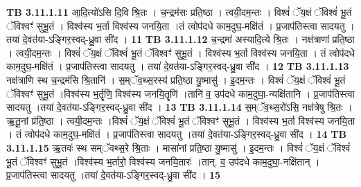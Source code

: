 \documentclass[17pt]{extarticle}
\begin{document}
{{{{{{{{{{{{{{{{{{{{{{                                \textbf{ TB 3.11.1.11} \newline
                  आ॒दि॒त्यो॑ऽसि दि॒वि श्रि॒तः । च॒न्द्रम॑सः प्रति॒ष्ठा । त्वयी॒दम॒न्तः । विश्वं॑ ॅय॒क्षं ॅविश्वं॑ भू॒तं ॅविश्वꣳ॑ सुभू॒तं । विश्व॑स्य भ॒र्ता विश्व॑स्य जनयि॒ता ।तं त्वोप॑दधे काम॒दुघ॒-मक्षि॑तं । प्र॒जाप॑तिस्त्वा सादयतु । तया॑ दे॒वत॑या-ऽङ्गिर॒स्वद्-ध्रु॒वा सी॑द । \textbf{ 11} \newline
                  \newline
                                \textbf{ TB 3.11.1.12} \newline
                  च॒न्द्रमा॑ अस्यादि॒त्ये श्रि॒तः । नक्ष॑त्राणां प्रति॒ष्ठा । त्वयी॒दम॒न्तः । विश्वं॑ ॅय॒क्षं ॅविश्वं॑ भू॒तं ॅविश्वꣳ॑ सुभू॒तं । विश्व॑स्य भ॒र्ता विश्व॑स्य जनयि॒ता । तं त्वोप॑दधे काम॒दुघ॒-मक्षि॑तं । प्र॒जाप॑तिस्त्वा सादयतु । तया॑ दे॒वत॑या-ऽङ्गिर॒स्वद्-ध्रु॒वा सी॑द । \textbf{ 12} \newline
                  \newline
                                \textbf{ TB 3.11.1.13} \newline
                  नक्ष॑त्राणि स्थ च॒न्द्रम॑सि श्रि॒तानि॑ । स॒म्ॅव॒थ्स॒रस्य॑ प्रति॒ष्ठा यु॒ष्मासु॑ । इ॒दम॒न्तः । विश्वं॑ ॅय॒क्षं ॅविश्वं॑ भू॒तं ॅविश्वꣳ॑ सुभू॒तं ।विश्व॑स्य भ॒र्तॄणि॒ विश्व॑स्य जनयि॒तॄणि॑ ।तानि॑ व॒ उप॑दधे काम॒दुघा॒-न्यक्षि॑तानि । प्र॒जाप॑तिस्त्वा सादयतु ।तया॑ दे॒वत॑या-ऽङ्गिर॒स्वद्-ध्रु॒वा सी॑द । \textbf{ 13} \newline
                  \newline
                                \textbf{ TB 3.11.1.14} \newline
                  स॒म्ॅव॒थ्स॒रो॑ऽसि॒ नक्ष॑त्रेषु श्रि॒तः । ऋ॒तू॒नां प्र॑ति॒ष्ठा । त्वयी॒दम॒न्तः ।विश्वं॑ ॅय॒क्षं ॅविश्वं॑ भू॒तं ॅविश्वꣳ॑ सुभू॒तं । विश्व॑स्य भ॒र्ता विश्व॑स्य जनयि॒ता । तं त्वोप॑दधे काम॒दुघ॒-मक्षि॑तं । प्र॒जाप॑तिस्त्वा सादयतु ।तया॑ दे॒वत॑या-ऽङ्गिर॒स्वद्-ध्रु॒वा सी॑द । \textbf{ 14} \newline
                  \newline
                                \textbf{ TB 3.11.1.15} \newline
                  ऋ॒तवः॑ स्थ सम्ॅवथ्स॒रे श्रि॒ताः । मासा॑नां प्रति॒ष्ठा यु॒ष्मासु॑ । इ॒दम॒न्तः । विश्वं॑ ॅय॒क्षं ॅविश्वं॑ भू॒तं ॅविश्वꣳ॑ सुभू॒तं ।विश्व॑स्य भ॒र्तारो॒ विश्व॑स्य जनयि॒तारः॑ ।तान्. व॒ उप॑दधे काम॒दुघा॒-नक्षि॑तान् । प्र॒जाप॑तिस्त्वा सादयतु ।तया॑ दे॒वत॑या-ऽङ्गिर॒स्वद्-ध्रु॒वा सी॑द । \textbf{ 15} \newline
                  \newline
}}}}}}}}}}}}}}}}}}}}}}
\end{document}

